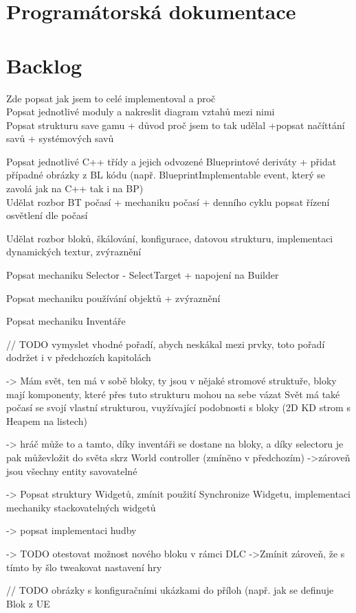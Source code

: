 
\chapter{Programátorská dokumentace}






\chapter{Backlog}

Zde popsat jak jsem to celé implementoval a proč\\

Popsat jednotlivé moduly a nakreslit diagram vztahů mezi nimi\\

Popsat strukturu save gamu + důvod proč jsem to tak udělal
+popsat načíttání savů + systémových savů


Popsat jednotlivé C++ třídy a jejich odvozené Blueprintové deriváty + přidat případné obrázky z BL kódu (např. BlueprintImplementable event, který se zavolá jak na C++ tak i na BP) \\

Udělat rozbor BT počasí + mechaniku počasí + denního cyklu
popsat řízení osvětlení dle počasí

Udělat rozbor bloků, škálování, konfigurace, datovou strukturu, implementaci dynamických textur, zvýraznění

Popsat mechaniku Selector - SelectTarget + napojení na Builder

Popsat mechaniku používání objektů + zvýraznění

Popsat mechaniku Inventáře

// TODO vymyslet vhodné pořadí, abych neskákal mezi prvky, toto pořadí dodržet i v předchozích kapitolách

-> Mám svět, ten má v sobě bloky, ty jsou v nějaké stromové struktuře, bloky mají komponenty, které přes tuto strukturu mohou na sebe vázat
Svět má také počasí se svojí vlastní strukturou, vuyžívající podobnosti s bloky (2D KD strom s Heapem na listech)

-> hráč může to a tamto, díky inventáři se dostane na bloky, a díky selectoru je pak můževložit do světa skrz World controller (zmíněno v předchozím)
->zároveň jsou všechny entity savovatelné 


-> Popsat struktury Widgetů, zmínit použití Synchronize Widgetu, implementaci mechaniky stackovatelných widgetů

-> popsat implementaci hudby

-> TODO otestovat možnost nového bloku v rámci DLC
->Zmínit zároveň, že s tímto by šlo tweakovat nastavení hry



// TODO obrázky s konfiguračními ukázkami do příloh (např. jak se definuje Blok z UE


